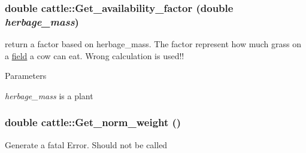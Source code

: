 \label{classcattle_a9aff531955828de8e998e2e44ba6f935}
\hypertarget{classcattle_aa66ca48a07bdaec8a2b280c47f6cc509}{
\subsubsection[{Get\_\-availability\_\-factor}]{\setlength{\rightskip}{0pt plus 5cm}double cattle::Get\_\-availability\_\-factor (double {\em herbage\_\-mass})}}
\label{classcattle_aa66ca48a07bdaec8a2b280c47f6cc509}
return a factor based on herbage\_\-mass. The factor represent how much grass on a \hyperlink{classfield}{field} a cow can eat. Wrong calculation is used!! 
\begin{DoxyParams}{Parameters}
\item[{\em herbage\_\-mass}]is a plant\end{DoxyParams}
\hypertarget{classcattle_a5b3d8710accc9b14ac6881ed758fe4ae}{
\subsubsection[{Get\_\-norm\_\-weight}]{\setlength{\rightskip}{0pt plus 5cm}double cattle::Get\_\-norm\_\-weight ()}}
\label{classcattle_a5b3d8710accc9b14ac6881ed758fe4ae}
Generate a fatal Error. Should not be called 

